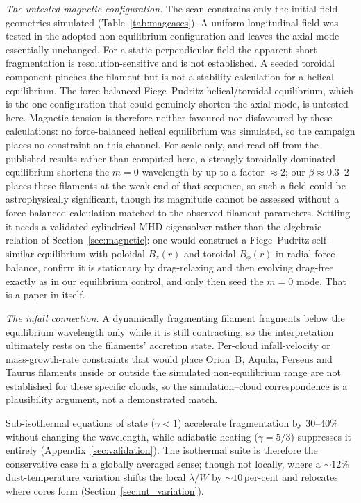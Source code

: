 \documentclass[usenatbib,twoside,twocolumn]{mnras}
\begin{document}
\emph{The untested magnetic configuration.} The scan constrains only the initial field geometries simulated (Table~\ref{tab:magcases}). A uniform longitudinal field was tested in the adopted non-equilibrium configuration and leaves the axial mode essentially unchanged. For a static perpendicular field the apparent short fragmentation is resolution-sensitive and is not established. A seeded toroidal component pinches the filament but is not a stability calculation for a helical equilibrium. The force-balanced Fiege--Pudritz helical/toroidal equilibrium, which is the one configuration that could genuinely shorten the axial mode, is untested here. Magnetic tension is therefore neither favoured nor disfavoured by these calculations: no force-balanced helical equilibrium was simulated, so the campaign places no constraint on this channel. For scale only, and read off from the published \citet{Fiege2000} results rather than computed here, a strongly toroidally dominated equilibrium shortens the $m=0$ wavelength by up to a factor $\approx2$; our $\beta\approx0.3$--$2$ places these filaments at the weak end of that sequence, so such a field could be astrophysically significant, though its magnitude cannot be assessed without a force-balanced calculation matched to the observed filament parameters. Settling it needs a validated cylindrical MHD eigensolver rather than the algebraic relation of Section~\ref{sec:magnetic}: one would construct a Fiege--Pudritz self-similar equilibrium with poloidal $B_z(r)$ and toroidal $B_\phi(r)$ in radial force balance, confirm it is stationary by drag-relaxing and then evolving drag-free exactly as in our equilibrium control, and only then seed the $m=0$ mode. That is a paper in itself.



\emph{The infall connection.} A dynamically fragmenting filament fragments below the equilibrium wavelength only while it is still contracting, so the interpretation ultimately rests on the filaments' accretion state. Per-cloud infall-velocity or mass-growth-rate constraints that would place Orion~B, Aquila, Perseus and Taurus filaments inside or outside the simulated non-equilibrium range are not established for these specific clouds, so the simulation--cloud correspondence is a plausibility argument, not a demonstrated match.

Sub-isothermal equations of state ($\gamma<1$) accelerate fragmentation by $30$--$40\%$ without changing the wavelength, while adiabatic heating ($\gamma=5/3$) suppresses it entirely (Appendix~\ref{sec:validation}). The isothermal suite is therefore the conservative case in a globally averaged sense; though not locally, where a $\sim12\%$ dust-temperature variation shifts the local $\lambda/W$ by $\sim10$\,per-cent and relocates where cores form (Section~\ref{sec:mt_variation}).
\end{document}
